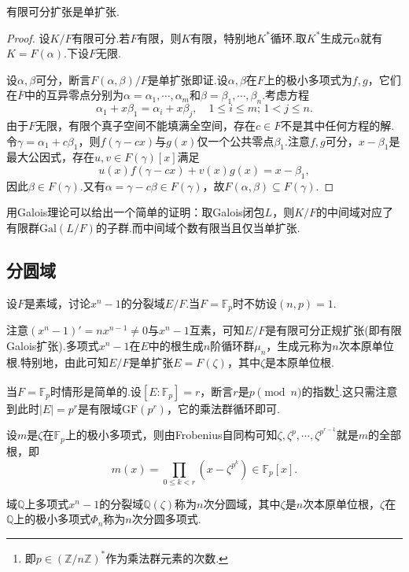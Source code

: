 \begin{thm}[(单扩张定理)]
    有限可分扩张是单扩张.
\end{thm}
\begin{proof}
    设$K/F$有限可分.若$F$有限，则$K$有限，特别地$K^*$循环.取$K^*$生成元$\alpha$就有$K=F(\alpha)$.下设$F$无限.

    设$\alpha,\beta$可分，断言$F(\alpha,\beta)/F$是单扩张即证.设$\alpha,\beta$在$F$上的极小多项式为$f,g$，它们在$\overline{F}$中的互异零点分别为$\alpha=\alpha_1,\cdots,\alpha_m$和$\beta=\beta_1,\cdots,\beta_n$.考虑方程
    \[
        \alpha_1+x\beta_1=\alpha_i+x\beta_j,\quad 1\le i\le m;\,1<j\le n.
    \]
    由于$F$无限，有限个真子空间不能填满全空间，存在$c\in F$不是其中任何方程的解.令$\gamma=\alpha_1+c\beta_1$，则$f(\gamma-cx)$与$g(x)$仅一个公共零点$\beta_1$.注意$f,g$可分，$x-\beta_1$是最大公因式，存在$u,v\in F(\gamma)[x]$满足
    \[
        u(x)f(\gamma-cx)+v(x)g(x)=x-\beta_1,
    \]
    因此$\beta\in F(\gamma)$.又有$\alpha=\gamma-c\beta\in F(\gamma)$，故$F(\alpha,\beta)\subseteq F(\gamma)$.
\end{proof}
\begin{remark}
    用Galois理论可以给出一个简单的证明：取Galois闭包$L$，则$K/F$的中间域对应了有限群$\mathrm{Gal}(L/F)$的子群.而中间域个数有限当且仅当单扩张.
\end{remark}

\subsection{分圆域}\label{subsec:cyclotomic}
设$F$是素域，讨论$x^n-1$的分裂域$E/F$.当$F=\mathbb{F}_p$时不妨设$(n,p)=1$.

注意$(x^n-1)'=nx^{n-1}\ne 0$与$x^n-1$互素，可知$E/F$是有限可分正规扩张(即有限Galois扩张).多项式$x^n-1$在$E$中的根生成$n$阶循环群$\mu_n$，生成元称为$n$次{\heiti 本原单位根}.特别地，由此可知$E/F$是单扩张$E=F(\zeta)$，其中$\zeta$是本原单位根.

\medskip 当$F=\mathbb{F}_p$时情形是简单的.设$[E:\mathbb{F}_p]=r$，断言$r$是$p\pmod n$的指数\footnote{即$p\in(\mathbb{Z}/n\mathbb{Z})^*$作为乘法群元素的次数.}.这只需注意到此时$|E|=p^r$是有限域$\mathrm{GF}(p^r)$，它的乘法群循环即可.

设$m$是$\zeta$在$\mathbb{F}_p$上的极小多项式，则由Frobenius自同构可知$\zeta,\zeta^p,\cdots,\zeta^{p^{r-1}}$就是$m$的全部根，即
\[
    m(x)=\prod_{0\le k<r}(x-\zeta^{p^k})\in\mathbb{F}_p[x].
\]

\begin{definition}
    域$\mathbb{Q}$上多项式$x^n-1$的分裂域$\mathbb{Q}(\zeta)$称为$n$次{\heiti 分圆域}，其中$\zeta$是$n$次本原单位根，$\zeta$在$\mathbb{Q}$上的极小多项式$\Phi_n$称为$n$次{\heiti 分圆多项式}.
\end{definition}

